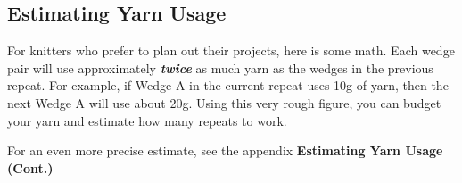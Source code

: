 \documentclass[12pt]{article}
\newcommand{\vocab}[1]{\emph{\textbf{#1}}} %
\newenvironment{frnote}
    {%
    	\def\FrameCommand{\fboxrule=\FrameRule\fboxsep=\FrameSep \fcolorbox{framecolor}{shadecolor}}
    	\MakeFramed {\advance\hsize-\width\FrameRestore}}
    {\endMakeFramed}
\begin{document}
\begin{multicols}{2}
\subsection*{Estimating Yarn Usage}

For knitters who prefer to plan out their projects, here is some math. Each wedge pair will use approximately \vocab{twice} as much yarn as the wedges in the previous repeat. For example, if Wedge A in the current repeat uses 10g of yarn, then the next Wedge A will use about 20g. Using this very rough figure, you can budget your yarn and estimate how many repeats to work.

\begin{frnote}
For an even more precise estimate, see the appendix \textbf{Estimating Yarn Usage (Cont.)}
\end{frnote}


\end{multicols}
\end{document}
